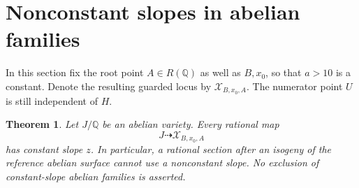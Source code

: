 \documentclass[11pt,a4paper]{article}
\newtheorem{theorem}{Theorem}[section]
\newcommand{\Q}{\mathbb Q}\newcommand{\Z}{\mathbb Z}
\begin{document}
\section{Nonconstant slopes in abelian families}

In this section fix the root point $A\in R(\Q)$ as well as
$B,x_0$, so that $a>10$ is a constant. Denote the resulting
guarded locus by $\mathcal X_{B,x_0,A}$. The numerator point $U$
is still independent of $H$.

\begin{theorem}\label{thm:abelian}
Let $J/\Q$ be an abelian variety. Every rational map
\[
                    J\dashrightarrow\mathcal X_{B,x_0,A}
\]
has constant slope $z$. In particular, a rational section after an
isogeny of the reference abelian surface cannot use a nonconstant
slope. No exclusion of constant-slope abelian families is asserted.
\end{theorem}
\end{document}
